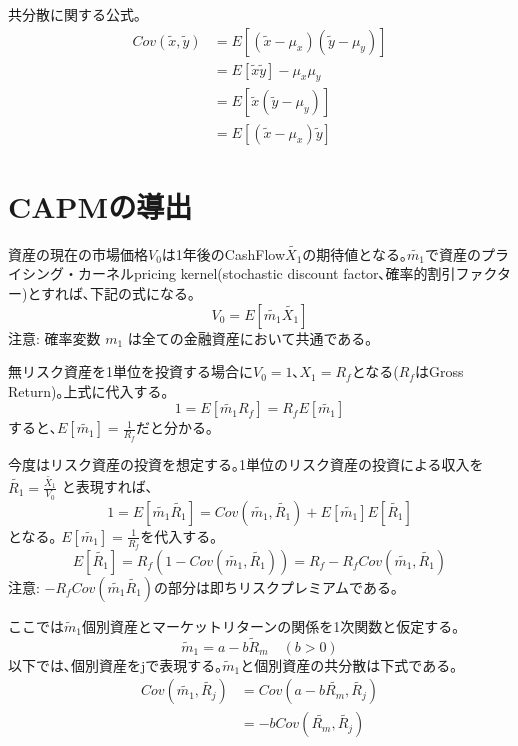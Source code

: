 \documentclass[uplatex,a4paper]{jsarticle}
\begin{document}
共分散に関する公式｡
\begin{align*}
Cov(\widetilde{x}, \widetilde{y})
& = E[(\widetilde{x} - \mu_x)(\widetilde{y} - \mu_y)]  \\
& = E[\tilde{x} \tilde{y}] - \mu_x \mu_y  \\
& = E[\tilde{x} (\tilde{y} - \mu_y  )]\\
& = E[(\tilde{x} - \mu_x  ) \tilde{y} ]
\end{align*}


\section{CAPMの導出}

資産の現在の市場価格$V_0$は1年後のCashFlow$\widetilde{X_1}$の期待値となる｡$\widetilde{m_1}$で資産のプライシング・カーネルpricing kernel(stochastic discount factor､確率的割引ファクター)とすれば､下記の式になる｡
\begin{equation*}
V_0 = E [\widetilde{m_1} \widetilde{X_1}]
\end{equation*}
注意: 確率変数 $ m_{1}$  は全ての金融資産において共通である｡

無リスク資産を1単位を投資する場合に$V_0 = 1$､$X_1 = R_f$となる($R_f$はGross Return)｡上式に代入する｡
\begin{equation*}
1 = E [\widetilde{m_1} R_f] = R_f E [\widetilde{m_1}]
\end{equation*}
すると､$\displaystyle E [\widetilde{m_1}] = \frac{1}{R_f}$だと分かる｡

今度はリスク資産の投資を想定する｡1単位のリスク資産の投資による収入を
$\displaystyle \widetilde{R_1} = \frac{\widetilde{X_1}}{V_0}$
と表現すれば､
\begin{equation*}
1 = E [\widetilde{m_1} \widetilde{R_1}] = Cov(\widetilde{m_1}, \widetilde{R_1}) +  E [\widetilde{m_1} ] E [ \widetilde{R_1}]
\end{equation*}
となる｡
$ E [\widetilde{m_1}] = \frac{1}{R_f}$を代入する｡
\begin{equation*}
E [ \widetilde{R_1}] = R_f \left ( 1- Cov(\widetilde{m_1}, \widetilde{R_1})\right ) =
R_f - R_f Cov(\widetilde{m_1}, \widetilde{R_1})
\end{equation*}
注意: $ - R_f Cov(\widetilde{m_1} \widetilde{R_1})$の部分は即ちリスクプレミアムである｡

ここでは$\widetilde m_1$個別資産とマーケットリターンの関係を1次関数と仮定する｡
\begin{equation*}
\widetilde m_1 = a -b \widetilde R_m   \quad  (b > 0)
\end{equation*}
以下では､個別資産をjで表現する｡$\widetilde m_1$と個別資産の共分散は下式である｡
\begin{align*}
Cov(\widetilde{m_1}, \widetilde{R_j})
& = Cov(a - b \widetilde{R_m}, \widetilde{R_j}) \\
& = - b  Cov( \widetilde{R_m}, \widetilde{R_j})
\end{align*}
\end{document}
